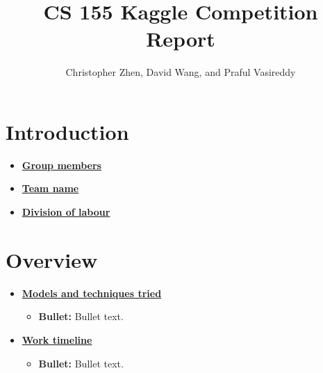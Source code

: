 \documentclass[11pt]{article}
\title{CS 155 Kaggle Competition Report}
\author{Christopher Zhen, David Wang, and Praful Vasireddy}
\newcommand{\boldline}[1]{\underline{\textbf{#1}}}
\begin{document}
	
	\maketitle
	
	\pagestyle{fancy}
	
	
	
	
	
	
	\section{Introduction}
	\medskip
	\begin{itemize}
		
		\item \boldline{Group members} \\
		
		\item \boldline{Team name} \\
		
		\item \boldline{Division of labour} \\
		
	\end{itemize}
	
	
	
	\section{Overview}
	\medskip
	\begin{itemize}
		
		\item \boldline{Models and techniques tried}
		\begin{itemize}
			\item \textbf{Bullet:} Bullet text.
		\end{itemize}
		
		\item \boldline{Work timeline}
		\begin{itemize}
			\item \textbf{Bullet:} Bullet text.
		\end{itemize}
		
	\end{itemize}
	
\end{document}
